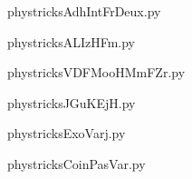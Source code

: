 
    \newcommand{\CaptionFigAdhIntFrDeux}{<+Type your caption here+>}
    \begin{center}
        
    \end{center}
    phystricksAdhIntFrDeux.py

    

    \clearpage
    


    \newcommand{\CaptionFigALIzHFm}{<+Type your caption here+>}
    \begin{center}
        
    \end{center}
    phystricksALIzHFm.py

    

    \clearpage
    


    \newcommand{\CaptionFigVDFMooHMmFZr}{<+Type your caption here+>}
    \begin{center}
        
    \end{center}
    phystricksVDFMooHMmFZr.py

    

    \clearpage
    


    \newcommand{\CaptionFigJGuKEjH}{<+Type your caption here+>}
    \begin{center}
        
    \end{center}
    phystricksJGuKEjH.py

    

    \clearpage
    


    \newcommand{\CaptionFigExoVarj}{<+Type your caption here+>}
    \begin{center}
        
    \end{center}
    phystricksExoVarj.py

    

    \clearpage
    


    \newcommand{\CaptionFigCoinPasVar}{<+Type your caption here+>}
    \begin{center}
        
    \end{center}
    phystricksCoinPasVar.py

